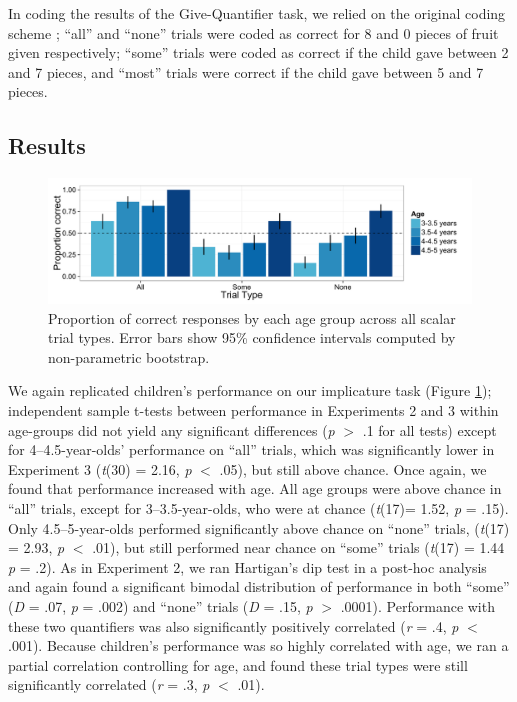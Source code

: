 \documentclass[man]{apa2}
\begin{document}
In coding the results of the Give-Quantifier task, we relied on the original coding scheme \cite{barner2009}; ``all'' and ``none'' trials were coded as correct for 8 and 0 pieces of fruit given respectively; ``some'' trials were coded as correct if the child gave between 2 and 7 pieces, and ``most'' trials were correct if the child gave between 5 and 7 pieces. 

\subsection{Results}

\begin{figure} 
 \begin{center} 
  \includegraphics[scale=.5]{figures/exp3_performance.pdf} 
  \caption{\label{fig:exp3_perf} Proportion of correct responses by each age group across all scalar trial types. Error bars show 95\% confidence intervals computed by non-parametric bootstrap.} 
 \end{center} 
\end{figure}

We again replicated children's performance on our implicature task (Figure \ref{fig:exp3_perf}); independent sample t-tests between performance in Experiments 2 and 3 within age-groups did not yield any significant differences (\emph{p} $>$ .1 for all tests) except for 4--4.5-year-olds' performance on ``all'' trials, which was significantly lower in Experiment 3 (\emph{t}(30) = 2.16, \emph{p} $<$ .05), but still above chance. Once again, we found that performance increased with age. All age groups were above chance in ``all'' trials, except for 3--3.5-year-olds, who were at chance (\emph{t}(17)= 1.52, \emph{p} = .15).  Only 4.5--5-year-olds performed significantly above chance on ``none'' trials, (\emph{t}(17) = 2.93, \emph{p} $<$ .01), but still performed near chance on ``some'' trials (\emph{t}(17) = 1.44 \emph{p} = .2). As in Experiment 2, we ran Hartigan's dip test in a post-hoc analysis and again found a significant bimodal distribution of performance in both ``some'' (\textit{D} = .07, \textit{p} = .002) and ``none'' trials (\textit{D} = .15, \textit{p} $>$ .0001). Performance with these two quantifiers was also significantly positively correlated (\emph{r} = .4, \emph{p} $<$ .001). Because children's performance was so highly correlated with age, we ran a partial correlation controlling for age, and found these trial types were still significantly correlated (\emph{r} = .3, \emph{p} $<$ .01). 
\end{document}
